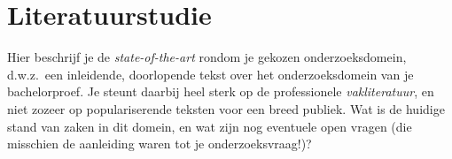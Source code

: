 






\section{Literatuurstudie}%
\label{sec:literatuurstudie}

Hier beschrijf je de \emph{state-of-the-art} rondom je gekozen onderzoeksdomein, d.w.z.\ een inleidende, doorlopende tekst over het onderzoeksdomein van je bachelorproef. Je steunt daarbij heel sterk op de professionele \emph{vakliteratuur}, en niet zozeer op populariserende teksten voor een breed publiek. Wat is de huidige stand van zaken in dit domein, en wat zijn nog eventuele open vragen (die misschien de aanleiding waren tot je onderzoeksvraag!)?

